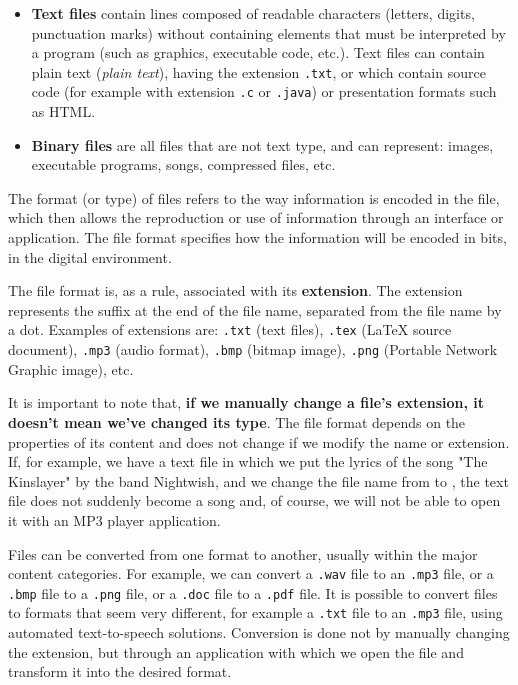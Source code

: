 \begin{itemize}
  \item \textbf{Text files} contain lines composed of readable characters (letters, digits, punctuation marks) without containing elements that must be interpreted by a program (such as graphics, executable code, etc.).
    Text files can contain plain text (\textit{plain text}), having the extension \texttt{.txt}, or which contain source code (for example with extension \texttt{.c} or \texttt{.java}) or presentation formats such as HTML.
  \item \textbf{Binary files} are all files that are not text type, and can represent: images, executable programs, songs, compressed files, etc.
\end{itemize}

The format (or type) of files refers to the way information is encoded in the file, which then allows the reproduction or use of information through an interface or application.
The file format specifies how the information will be encoded in bits, in the digital environment.

The file format is, as a rule, associated with its \textbf{extension}.
The extension represents the suffix at the end of the file name, separated from the file name by a dot.
Examples of extensions are: \texttt{.txt} (text files), \texttt{.tex} (LaTeX source document), \texttt{.mp3} (audio format), \texttt{.bmp} (bitmap image), \texttt{.png} (Portable Network Graphic image), etc.

It is important to note that, \textbf{if we manually change a file's extension, it doesn't mean we've changed its type}.
The file format depends on the properties of its content and does not change if we modify the name or extension.
If, for example, we have a text file in which we put the lyrics of the song "The Kinslayer" by the band Nightwish, and we change the file name from  to , the text file does not suddenly become a song and, of course, we will not be able to open it with an MP3 player application.

Files can be converted from one format to another, usually within the major content categories.
For example, we can convert a \texttt{.wav} file to an \texttt{.mp3} file, or a \texttt{.bmp} file to a \texttt{.png} file, or a \texttt{.doc} file to a \texttt{.pdf} file.
It is possible to convert files to formats that seem very different, for example a \texttt{.txt} file to an \texttt{.mp3} file, using automated text-to-speech solutions.
Conversion is done not by manually changing the extension, but through an application with which we open the file and transform it into the desired format.

